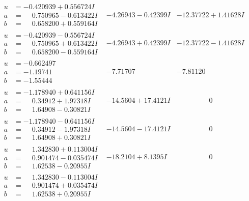 \documentclass[1p]{elsarticle_modified}
\theoremstyle{definition}
\begin{document}
$$\begin{array}{c|c|c}
\begin{aligned}
u &= -0.420939 + 0.556724 I \\
a &= \phantom{-}0.750965 - 0.613422 I \\
b &= \phantom{-}0.658200 + 0.559164 I\end{aligned}
 & -4.26943 - 0.42399 I & -12.37722 + 1.41628 I \\ \hline\begin{aligned}
u &= -0.420939 - 0.556724 I \\
a &= \phantom{-}0.750965 + 0.613422 I \\
b &= \phantom{-}0.658200 - 0.559164 I\end{aligned}
 & -4.26943 + 0.42399 I & -12.37722 - 1.41628 I \\ \hline\begin{aligned}
u &= -0.662497\phantom{ +0.000000I} \\
a &= -1.19741\phantom{ +0.000000I} \\
b &= -1.55444\phantom{ +0.000000I}\end{aligned}
 & -7.71707\phantom{ +0.000000I} & -7.81120\phantom{ +0.000000I} \\ \hline\begin{aligned}
u &= -1.178940 + 0.641156 I \\
a &= \phantom{-}0.34912 + 1.97318 I \\
b &= \phantom{-}1.64908 - 0.30821 I\end{aligned}
 & -14.5604 + 17.4121 I & \phantom{-0.000000 } 0 \\ \hline\begin{aligned}
u &= -1.178940 - 0.641156 I \\
a &= \phantom{-}0.34912 - 1.97318 I \\
b &= \phantom{-}1.64908 + 0.30821 I\end{aligned}
 & -14.5604 - 17.4121 I & \phantom{-0.000000 } 0 \\ \hline\begin{aligned}
u &= \phantom{-}1.342830 + 0.113004 I \\
a &= \phantom{-}0.901474 - 0.035474 I \\
b &= \phantom{-}1.62538 - 0.20955 I\end{aligned}
 & -18.2104 + 8.1395 I & \phantom{-0.000000 } 0 \\ \hline\begin{aligned}
u &= \phantom{-}1.342830 - 0.113004 I \\
a &= \phantom{-}0.901474 + 0.035474 I \\
b &= \phantom{-}1.62538 + 0.20955 I\end{aligned}

\end{array}$$
\end{document}
